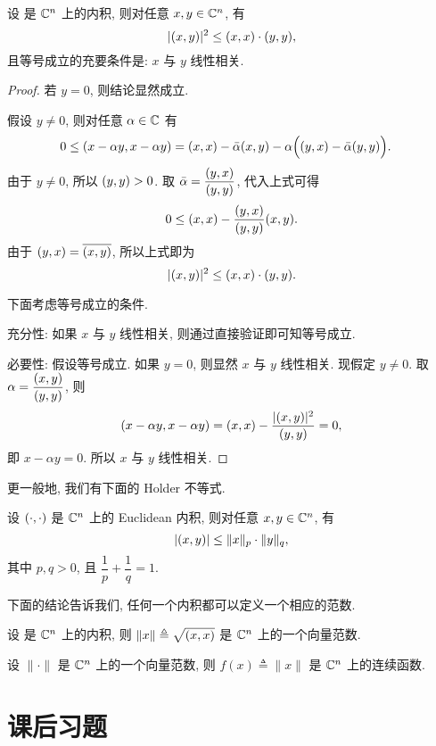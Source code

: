 \begin{theorem}\label{Th:01-norm11}
	设 \ip{\cdot,\cdot} 是 $\mathbb{C}^n$ 上的内积, 则对任意 $x,y\in\mathbb{C}^n$, 有
	$$|( x,y )|^2 \leq ( x,x )\cdot ( y,y ), $$
	且等号成立的充要条件是: $x$ 与 $y$ 线性相关.
\end{theorem}
\begin{proof}
	若 $y=0$, 则结论显然成立.
	
	假设 $y\neq0$, 则对任意 $\alpha\in\mathbb{C}$ 有
	\begin{align*}
		0 & \leq ( x-\alpha y, x-\alpha y )
		= ( x,x ) -\bar{\alpha}( x,y )
		-\alpha\Big(( y,x )-\bar{\alpha}( y,y )\Big).
	\end{align*}
	由于 $y\neq0$, 所以 $( y,y )>0$.
	取 $\bar\alpha=\dfrac{( y,x )}{( y,y )}$, 代入上式可得
	$$ 0\leq ( x,x ) - \frac{( y,x )}{( y,y )}( x,y ).$$
	由于 $( y,x )=\overline{( x,y )}$, 所以上式即为
	$$ |( x,y )|^2 \leq ( x,x )\cdot ( y,y ).$$
	
	下面考虑等号成立的条件.
	
	充分性: 如果 $x$ 与 $y$ 线性相关, 则通过直接验证即可知等号成立.
	
	必要性: 假设等号成立. 如果 $y=0$, 则显然 $x$ 与 $y$ 线性相关.
	现假定 $y\neq 0$. 取 $\alpha=\dfrac{( x,y )}{( y,y )}$,
	则
	$$ ( x-\alpha y, x-\alpha y )
	=( x,x ) -\frac{|( x,y )|^2}{( y,y )}
	=0,
	$$
	即 $x-\alpha y=0$. 所以 $x$ 与 $y$ 线性相关.
\end{proof}

更一般地, 我们有下面的 Holder 不等式.
\begin{theorem}
	设 $( \cdot,\cdot )$ 是 $\mathbb{C}^n$ 上的 Euclidean 内积,
	则对任意 $x,y\in\mathbb{C}^n$, 有
	$$|( x,y )| \leq \|x\|_p \cdot \|y\|_q, $$
	其中 $p,q>0$, 且 $\dfrac1p + \dfrac1q = 1$.
\end{theorem}
%
下面的结论告诉我们, 任何一个内积都可以定义一个相应的范数.
\begin{corollary}\label{Cor:innner-product}
	设 \ip{\cdot,\cdot} 是 $\mathbb{C}^n$ 上的内积,
	则 $\|x\|\triangleq \sqrt{( x,x )}$ 是 $\mathbb{C}^n$ 上的一个向量范数.
\end{corollary}


\begin{theorem}[范数的连续性]
	设 $\|\cdot\|$ 是 $\mathbb{C}^n$ 上的一个向量范数, 则
	$f(x)\triangleq \|x\|$ 是 $\mathbb{C}^n$ 上的连续函数.
\end{theorem}


\section{课后习题}

